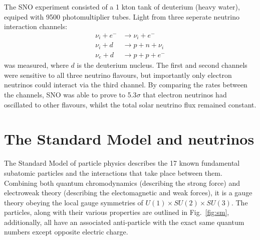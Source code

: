 The SNO experiment consisted of a 1 kton tank of deuterium (heavy water), equiped with 9500
photomultiplier tubes. Light from three seperate neutrino interaction channels:
\begin{align} %
    \nu_{i}+e^{-} & \rightarrow \nu_{i}+e^{-} \\
    \nu_{i}+d     & \rightarrow p+n+\nu_{i}   \\
    \nu_{e}+d     & \rightarrow p+p+e^{-}
\end{align} %
was measured, where $d$ is the deuterium nucleus. The first and second channels were sensitive to
all three neutrino flavours, but importantly only electron neutrinos could interact via the third
channel. By comparing the rates between the channels, SNO was able to prove to 5.3$\sigma$ that
electron neutrinos had oscillated to other flavours, whilst the total solar neutrino flux remained
constant.

\section{The Standard Model and neutrinos}
\label{sec:theory_sm}

The Standard Model of particle physics describes the 17 known fundamental subatomic particles and
the interactions that take place between them. Combining both quantum chromodynamics (describing
the strong force) and electroweak theory (describing the electomagnetic and weak forces), it is a
gauge theory obeying the local gauge symmetries of $U(1) \times SU(2) \times SU(3)$. The particles,
along with their various properties are outlined in Fig.~\ref{fig:sm}, additionally, all have an
associated anti-particle with the exact same quantum numbers except opposite electric charge.

